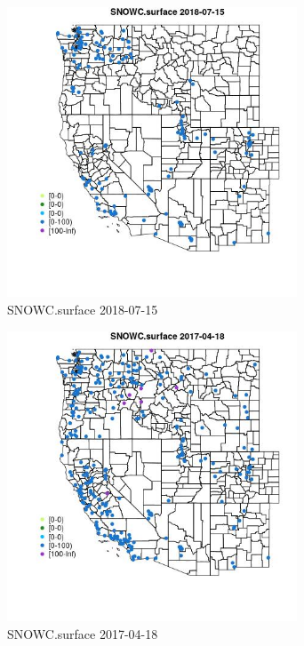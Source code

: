 \begin{figure} 
\centering  
\includegraphics[width=0.77\textwidth]{Code_Outputs/Report_ML_input_PM25_Step4_part_e_de_duplicated_aves_compiled_2019-05-20wNAs_MapObsSNOWCsurface2018-07-15.jpg} 
\caption{\label{fig:Report_ML_input_PM25_Step4_part_e_de_duplicated_aves_compiled_2019-05-20wNAsMapObsSNOWCsurface2018-07-15}SNOWC.surface 2018-07-15} 
\end{figure} 
 

\begin{figure} 
\centering  
\includegraphics[width=0.77\textwidth]{Code_Outputs/Report_ML_input_PM25_Step4_part_e_de_duplicated_aves_compiled_2019-05-20wNAs_MapObsSNOWCsurface2017-04-18.jpg} 
\caption{\label{fig:Report_ML_input_PM25_Step4_part_e_de_duplicated_aves_compiled_2019-05-20wNAsMapObsSNOWCsurface2017-04-18}SNOWC.surface 2017-04-18} 
\end{figure} 
 

